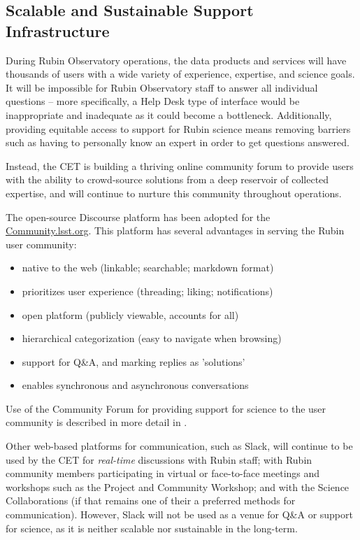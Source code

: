 \documentclass[DM,lsstdraft,toc]{lsstdoc}
\begin{document}
\subsection{Scalable and Sustainable Support Infrastructure}\label{ssec:mod_support}

During Rubin Observatory operations, the data products and services will have thousands of users with a wide variety of experience, expertise, and science goals.
It will be impossible for Rubin Observatory staff to answer all individual questions -- more specifically, a Help Desk type of interface would be inappropriate and inadequate as it could become a bottleneck.
Additionally, providing equitable access to support for Rubin science means removing barriers such as having to personally know an expert in order to get questions answered.

Instead, the CET is building a thriving online community forum to provide users with the ability to crowd-source solutions from a deep reservoir of collected expertise, and will continue to nurture this community throughout operations.

The open-source Discourse platform has been adopted for the \url{Community.lsst.org}.
This platform has several advantages in serving the Rubin user community:
\begin{itemize}
\item native to the web (linkable; searchable; markdown format)
\item prioritizes user experience (threading; liking; notifications)
\item open platform (publicly viewable, accounts for all)
\item hierarchical categorization (easy to navigate when browsing)
\item support for Q\&A, and marking replies as 'solutions'
\item enables synchronous and asynchronous conversations
\end{itemize}

Use of the Community Forum for providing support for science to the user community is described in more detail in .

Other web-based platforms for communication, such as Slack, will continue to be used by the CET for \textit{real-time} discussions with Rubin staff; with Rubin community members participating in virtual or face-to-face meetings and workshops such as the Project and Community Workshop; and with the Science Collaborations (if that remains one of their a preferred methods for communication).
However, Slack will not be used as a venue for Q\&A or support for science, as it is neither scalable nor sustainable in the long-term.
\end{document}
